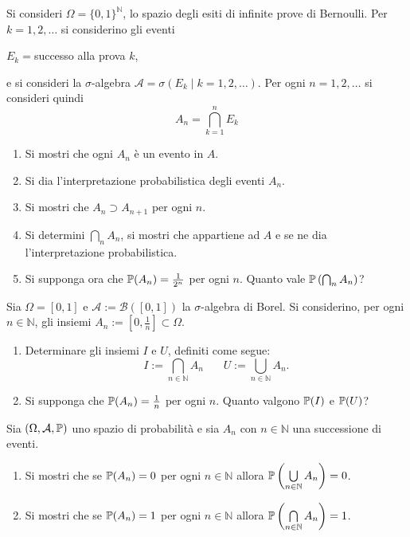 Si consideri $\Omega =\{0,1\}^{\mathbb{N}}$, lo spazio degli esiti di infinite prove di Bernoulli. Per $k=1,2,\dots $ si considerino gli eventi
\begin{center}
$E_{k} =$successo alla prova $k$,
\end{center}
e si consideri la $\sigma $-algebra $\mathcal{A} =\sigma ( E_{k} \mid k=1,2,\dots )$. Per ogni $n=1,2,\dots $ si consideri quindi
\begin{equation*}
A_{n} =\bigcap _{k=1}^{n} E_{k}
\end{equation*}
\begin{enumerate}
\item Si mostri che ogni $A_{n}$ è un evento in $A$.
\item Si dia l'interpretazione probabilistica degli eventi $A_{n}$.
\item Si mostri che $A_{n} \supset A_{n+1}$ per ogni $n$.
\item Si determini $\bigcap _{n} A_{n}$, si mostri che appartiene ad $A$ e se ne dia l'interpretazione probabilistica.
\item Si supponga ora che $\mathbb{P}( A_{n}) =\frac{1}{2^{n}}$ per ogni $n$. Quanto vale $\mathbb{P}\left(\bigcap_{n} A_{n}\right)$?
\end{enumerate}
\Esercizio{}

Sia $\Omega =[ 0,1]$ e $\mathcal{A} :=\mathcal{B}([ 0,1])$ la $\sigma $-algebra di Borel. Si considerino, per ogni $n\in \mathbb{N}$, gli insiemi $A_{n} :=\left[ 0,\frac{1}{n}\right] \subset \Omega $.
\begin{enumerate}
\item Determinare gli insiemi $I$ e $U$, definiti come segue:\begin{equation*}
I:=\bigcap _{n\in \mathbb{N}} A_{n} \ \ \ \ \ \ \ \ U:=\bigcup _{n\in \mathbb{N}} A_{n} .
\end{equation*}
\item Si supponga che $\mathbb{P}( A_{n}) =\frac{1}{n}$ per ogni $n$. Quanto valgono $\mathbb{P}( I)$ e $\mathbb{P}( U)$?
\end{enumerate}
\Esercizio{$\star$}

Sia $( \Omega ,\mathcal{A} ,\mathbb{P})$ uno spazio di probabilità e sia $A_{n}$ con $n\in \mathbb{N}$ una successione di eventi.
\begin{enumerate}
\item Si mostri che se $\mathbb{P}( A_{n}) =0$ per ogni $n\in \mathbb{N}$ allora $\mathbb{P}\left(\bigcup\limits _{n\in \mathbb{N}} A_{n}\right) =0$.
\item Si mostri che se $\mathbb{P}( A_{n}) =1$ per ogni $n\in \mathbb{N}$ allora $\mathbb{P}\left(\bigcap\limits _{n\in \mathbb{N}} A_{n}\right) =1$.
\end{enumerate}
\Esercizio{$\star$}

